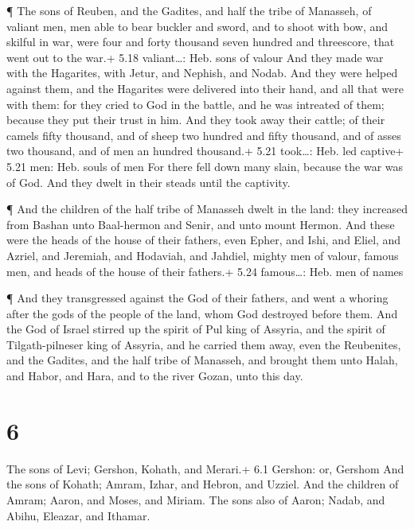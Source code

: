  ¶ The sons of Reuben, and the Gadites, and half the tribe
of Manasseh, of valiant men, men able to bear buckler and sword, and to
shoot with bow, and skilful in war, were four and forty thousand seven
hundred and threescore, that went out to the war.+ 5.18 valiant\ldots:
Heb. sons of valour  And they made war with the Hagarites,
with Jetur, and Nephish, and Nodab.  And they were helped
against them, and the Hagarites were delivered into their hand, and all
that were with them: for they cried to God in the battle, and he was
intreated of them; because they put their trust in him. 
And they took away their cattle; of their camels fifty thousand, and of
sheep two hundred and fifty thousand, and of asses two thousand, and of
men an hundred thousand.+ 5.21 took\ldots: Heb. led captive+ 5.21 men:
Heb. souls of men  For there fell down many slain, because
the war was of God. And they dwelt in their steads until the captivity.

 ¶ And the children of the half tribe of Manasseh dwelt in
the land: they increased from Bashan unto Baal-hermon and Senir, and
unto mount Hermon.  And these were the heads of the house
of their fathers, even Epher, and Ishi, and Eliel, and Azriel, and
Jeremiah, and Hodaviah, and Jahdiel, mighty men of valour, famous men,
and heads of the house of their fathers.+ 5.24 famous\ldots: Heb. men of
names

 ¶ And they transgressed against the God of their fathers,
and went a whoring after the gods of the people of the land, whom God
destroyed before them.  And the God of Israel stirred up
the spirit of Pul king of Assyria, and the spirit of Tilgath-pilneser
king of Assyria, and he carried them away, even the Reubenites, and the
Gadites, and the half tribe of Manasseh, and brought them unto Halah,
and Habor, and Hara, and to the river Gozan, unto this day.

\hypertarget{section-5}{%
\section{6}\label{section-5}}

 The sons of Levi; Gershon, Kohath, and Merari.+ 6.1
Gershon: or, Gershom  And the sons of Kohath; Amram, Izhar,
and Hebron, and Uzziel.  And the children of Amram; Aaron,
and Moses, and Miriam. The sons also of Aaron; Nadab, and Abihu,
Eleazar, and Ithamar.

